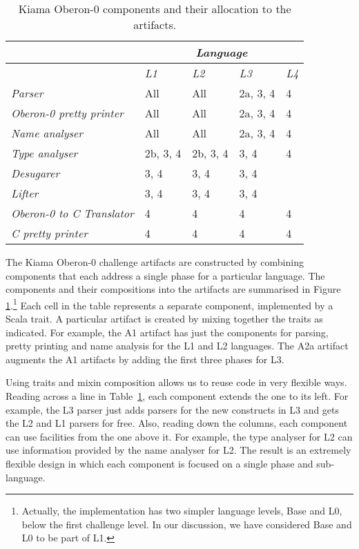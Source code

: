 \begin{table}\centering
\begin{tabular}{|l|p{1.5cm}|p{1.5cm}|p{1.5cm}|p{1.5cm}|} \hline
& \multicolumn{4}{c|}{\emph{Language}} \\ \hline
& \emph{L1}    & \emph{L2}    & \emph{L3} & \emph{L4} \\ \hline
\emph{Parser}
& All          & All          & 2a, 3, 4  & 4         \\ \hline
\emph{Oberon-0 pretty printer}
& All          & All          & 2a, 3, 4  & 4         \\ \hline
\emph{Name analyser}
& All          & All          & 2a, 3, 4  & 4         \\ \hline
\emph{Type analyser}
& 2b, 3, 4     & 2b, 3, 4     & 3, 4      & 4         \\ \hline
\emph{Desugarer}
& 3, 4         & 3, 4         & 3, 4      &           \\ \hline
\emph{Lifter}
& 3, 4         & 3, 4         & 3, 4      &           \\ \hline
\emph{Oberon-0 to C Translator}
& 4            & 4            & 4         & 4         \\ \hline
\emph{C pretty printer}
& 4            & 4            & 4         & 4         \\ \hline
\end{tabular}
\caption{Kiama Oberon-0 components and their allocation to the artifacts.}    
\label{tab:kiama-artifacts}
\end{table}

The Kiama Oberon-0 challenge artifacts are constructed by combining components that each address a single phase for a particular language.
The components and their compositions into the artifacts are summarised in Figure \ref{tab:kiama-artifacts}.\footnote{
Actually, the implementation has two simpler language levels, Base and L0, below the first challenge level.
In our discussion, we have considered Base and L0 to be part of L1.
}
Each cell in the table represents a separate component, implemented by a Scala trait.
A particular artifact is created by mixing together the traits as indicated.
For example, the A1 artifact has just the components for parsing, pretty printing and name analysis for the L1 and L2 languages.
The A2a artifact augments the A1 artifacts by adding the first three phases for L3.

Using traits and mixin composition allows us to reuse code in very flexible ways. 
Reading across a line in Table~\ref{tab:kiama-artifacts}, each component extends the one to its left.
For example, the L3 parser just adds parsers for the new constructs in L3 and gets the L2 and L1 parsers for free.
Also, reading down the columns, each component can use facilities from the one above it.
For example, the type analyser for L2 can use information provided by the name analyser for L2.
The result is an extremely flexible design in which each component is focused on a single phase and sub-language.

